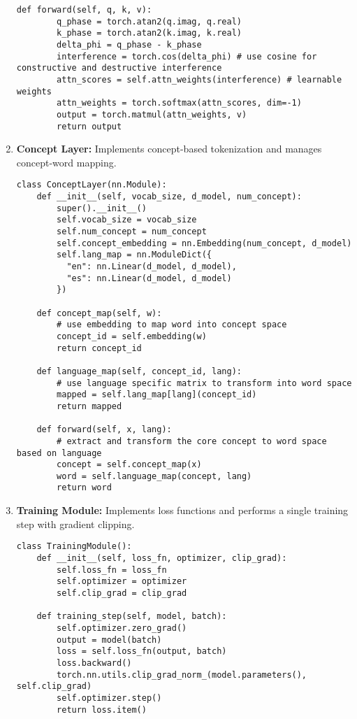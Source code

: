 \documentclass[11pt, a4paper]{article}
\begin{document}
\begin{enumerate}
\begin{lstlisting}[caption=Interference Attention Module]
    def forward(self, q, k, v):
        q_phase = torch.atan2(q.imag, q.real)
        k_phase = torch.atan2(k.imag, k.real)
        delta_phi = q_phase - k_phase
        interference = torch.cos(delta_phi) # use cosine for constructive and destructive interference
        attn_scores = self.attn_weights(interference) # learnable weights
        attn_weights = torch.softmax(attn_scores, dim=-1)
        output = torch.matmul(attn_weights, v)
        return output
        \end{lstlisting}
    \item \textbf{Concept Layer:} Implements concept-based tokenization and manages concept-word mapping.
        \begin{lstlisting}[caption=Concept Layer Module]
class ConceptLayer(nn.Module):
    def __init__(self, vocab_size, d_model, num_concept):
        super().__init__()
        self.vocab_size = vocab_size
        self.num_concept = num_concept
        self.concept_embedding = nn.Embedding(num_concept, d_model)
        self.lang_map = nn.ModuleDict({
          "en": nn.Linear(d_model, d_model),
          "es": nn.Linear(d_model, d_model)
        })

    def concept_map(self, w):
        # use embedding to map word into concept space
        concept_id = self.embedding(w)
        return concept_id

    def language_map(self, concept_id, lang):
        # use language specific matrix to transform into word space
        mapped = self.lang_map[lang](concept_id)
        return mapped

    def forward(self, x, lang):
        # extract and transform the core concept to word space based on language
        concept = self.concept_map(x)
        word = self.language_map(concept, lang)
        return word
        \end{lstlisting}
    \item \textbf{Training Module:} Implements loss functions and performs a single training step with gradient clipping.
        \begin{lstlisting}[caption=Training Module]
class TrainingModule():
    def __init__(self, loss_fn, optimizer, clip_grad):
        self.loss_fn = loss_fn
        self.optimizer = optimizer
        self.clip_grad = clip_grad

    def training_step(self, model, batch):
        self.optimizer.zero_grad()
        output = model(batch)
        loss = self.loss_fn(output, batch)
        loss.backward()
        torch.nn.utils.clip_grad_norm_(model.parameters(), self.clip_grad)
        self.optimizer.step()
        return loss.item()
        \end{lstlisting}
\end{enumerate}
\end{document}
